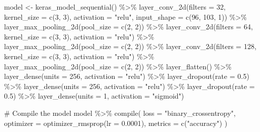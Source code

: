 \documentclass[
  a4paperpaper,
]{article}
\newenvironment{Shaded}{\begin{snugshade}}{\end{snugshade}}
\newcommand{\AttributeTok}[1]{\textcolor[rgb]{0.40,0.45,0.13}{#1}}
\newcommand{\CommentTok}[1]{\textcolor[rgb]{0.37,0.37,0.37}{#1}}
\newcommand{\DecValTok}[1]{\textcolor[rgb]{0.68,0.00,0.00}{#1}}
\newcommand{\FloatTok}[1]{\textcolor[rgb]{0.68,0.00,0.00}{#1}}
\newcommand{\FunctionTok}[1]{\textcolor[rgb]{0.28,0.35,0.67}{#1}}
\newcommand{\NormalTok}[1]{\textcolor[rgb]{0.00,0.23,0.31}{#1}}
\newcommand{\OtherTok}[1]{\textcolor[rgb]{0.00,0.23,0.31}{#1}}
\newcommand{\SpecialCharTok}[1]{\textcolor[rgb]{0.37,0.37,0.37}{#1}}
\newcommand{\StringTok}[1]{\textcolor[rgb]{0.13,0.47,0.30}{#1}}
\begin{document}
\begin{Shaded}
\begin{Highlighting}[]
\NormalTok{model }\OtherTok{\textless{}{-}} \FunctionTok{keras\_model\_sequential}\NormalTok{() }\SpecialCharTok{\%\textgreater{}\%}
  \FunctionTok{layer\_conv\_2d}\NormalTok{(}\AttributeTok{filters =} \DecValTok{32}\NormalTok{, }\AttributeTok{kernel\_size =} \FunctionTok{c}\NormalTok{(}\DecValTok{3}\NormalTok{, }\DecValTok{3}\NormalTok{), }\AttributeTok{activation =} \StringTok{"relu"}\NormalTok{, }\AttributeTok{input\_shape =} \FunctionTok{c}\NormalTok{(}\DecValTok{96}\NormalTok{, }\DecValTok{103}\NormalTok{, }\DecValTok{1}\NormalTok{)) }\SpecialCharTok{\%\textgreater{}\%}
  \FunctionTok{layer\_max\_pooling\_2d}\NormalTok{(}\AttributeTok{pool\_size =} \FunctionTok{c}\NormalTok{(}\DecValTok{2}\NormalTok{, }\DecValTok{2}\NormalTok{)) }\SpecialCharTok{\%\textgreater{}\%}
  \FunctionTok{layer\_conv\_2d}\NormalTok{(}\AttributeTok{filters =} \DecValTok{64}\NormalTok{, }\AttributeTok{kernel\_size =} \FunctionTok{c}\NormalTok{(}\DecValTok{3}\NormalTok{, }\DecValTok{3}\NormalTok{), }\AttributeTok{activation =} \StringTok{"relu"}\NormalTok{) }\SpecialCharTok{\%\textgreater{}\%}
  \FunctionTok{layer\_max\_pooling\_2d}\NormalTok{(}\AttributeTok{pool\_size =} \FunctionTok{c}\NormalTok{(}\DecValTok{2}\NormalTok{, }\DecValTok{2}\NormalTok{)) }\SpecialCharTok{\%\textgreater{}\%}
  \FunctionTok{layer\_conv\_2d}\NormalTok{(}\AttributeTok{filters =} \DecValTok{128}\NormalTok{, }\AttributeTok{kernel\_size =} \FunctionTok{c}\NormalTok{(}\DecValTok{3}\NormalTok{, }\DecValTok{3}\NormalTok{), }\AttributeTok{activation =} \StringTok{"relu"}\NormalTok{) }\SpecialCharTok{\%\textgreater{}\%}
  \FunctionTok{layer\_max\_pooling\_2d}\NormalTok{(}\AttributeTok{pool\_size =} \FunctionTok{c}\NormalTok{(}\DecValTok{2}\NormalTok{, }\DecValTok{2}\NormalTok{)) }\SpecialCharTok{\%\textgreater{}\%}
  \FunctionTok{layer\_flatten}\NormalTok{() }\SpecialCharTok{\%\textgreater{}\%}
  \FunctionTok{layer\_dense}\NormalTok{(}\AttributeTok{units =} \DecValTok{256}\NormalTok{, }\AttributeTok{activation =} \StringTok{"relu"}\NormalTok{) }\SpecialCharTok{\%\textgreater{}\%}
  \FunctionTok{layer\_dropout}\NormalTok{(}\AttributeTok{rate =} \FloatTok{0.5}\NormalTok{) }\SpecialCharTok{\%\textgreater{}\%}
  \FunctionTok{layer\_dense}\NormalTok{(}\AttributeTok{units =} \DecValTok{256}\NormalTok{, }\AttributeTok{activation =} \StringTok{"relu"}\NormalTok{) }\SpecialCharTok{\%\textgreater{}\%}
  \FunctionTok{layer\_dropout}\NormalTok{(}\AttributeTok{rate =} \FloatTok{0.5}\NormalTok{) }\SpecialCharTok{\%\textgreater{}\%}
  \FunctionTok{layer\_dense}\NormalTok{(}\AttributeTok{units =} \DecValTok{1}\NormalTok{, }\AttributeTok{activation =} \StringTok{"sigmoid"}\NormalTok{)}

\CommentTok{\# Compile the model}
\NormalTok{model }\SpecialCharTok{\%\textgreater{}\%} \FunctionTok{compile}\NormalTok{(}
  \AttributeTok{loss =} \StringTok{"binary\_crossentropy"}\NormalTok{,}
  \AttributeTok{optimizer =} \FunctionTok{optimizer\_rmsprop}\NormalTok{(}\AttributeTok{lr =} \FloatTok{0.0001}\NormalTok{),}
  \AttributeTok{metrics =} \FunctionTok{c}\NormalTok{(}\StringTok{"accuracy"}\NormalTok{)}
\NormalTok{)}
\end{Highlighting}
\end{Shaded}
\end{document}
